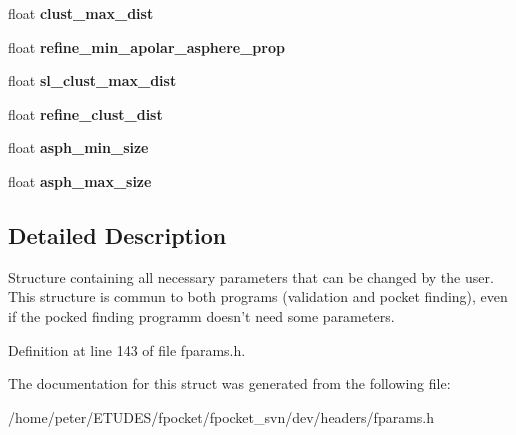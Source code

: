 \begin{CompactItemize}
\item 
\hypertarget{structs__fparams_cd506e600d2b5077f7925847be38c854}{
float \textbf{clust\_\-max\_\-dist}}
\label{structs__fparams_cd506e600d2b5077f7925847be38c854}

\item 
\hypertarget{structs__fparams_50d6211ea1f5d9b90c10f866c82e54b8}{
float \textbf{refine\_\-min\_\-apolar\_\-asphere\_\-prop}}
\label{structs__fparams_50d6211ea1f5d9b90c10f866c82e54b8}

\item 
\hypertarget{structs__fparams_71691bbfb98d90e12ca8cb3c79e2688c}{
float \textbf{sl\_\-clust\_\-max\_\-dist}}
\label{structs__fparams_71691bbfb98d90e12ca8cb3c79e2688c}

\item 
\hypertarget{structs__fparams_8ba147c559344c3f0406c1e7a86b98d1}{
float \textbf{refine\_\-clust\_\-dist}}
\label{structs__fparams_8ba147c559344c3f0406c1e7a86b98d1}

\item 
\hypertarget{structs__fparams_545b7bea97958089689608fff6b8910d}{
float \textbf{asph\_\-min\_\-size}}
\label{structs__fparams_545b7bea97958089689608fff6b8910d}

\item 
\hypertarget{structs__fparams_7439af209766e39dad7e39f4c6e19711}{
float \textbf{asph\_\-max\_\-size}}
\label{structs__fparams_7439af209766e39dad7e39f4c6e19711}

\end{CompactItemize}


\subsection{Detailed Description}
Structure containing all necessary parameters that can be changed by the user. This structure is commun to both programs (validation and pocket finding), even if the pocked finding programm doesn't need some parameters. 

Definition at line 143 of file fparams.h.

The documentation for this struct was generated from the following file:\begin{CompactItemize}
\item 
/home/peter/ETUDES/fpocket/fpocket\_\-svn/dev/headers/fparams.h\end{CompactItemize}
